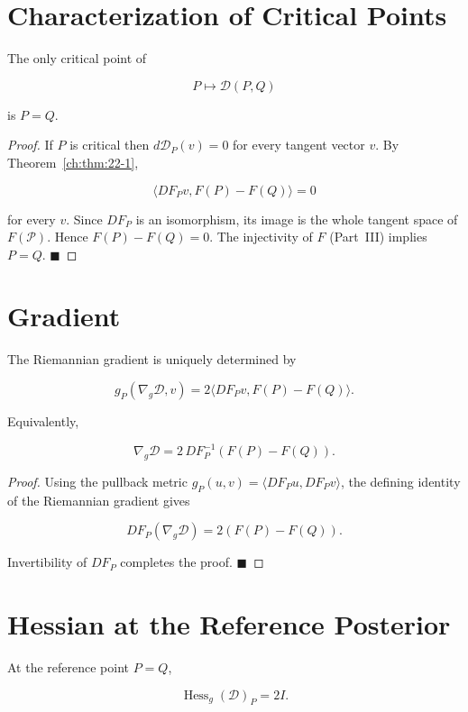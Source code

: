 \section{Characterization of Critical Points}

\begin{theorem}
\label{ch:thm:22-2}
The only critical point of

\[
P\mapsto\mathcal D(P,Q)
\]

is \(P=Q\).
\end{theorem}

\begin{proof}
If \(P\) is critical then \(d\mathcal D_P(v)=0\) for every tangent
vector \(v\). By Theorem~\ref{ch:thm:22-1},

\[
\langle DF_Pv,F(P)-F(Q)\rangle=0
\]

for every \(v\). Since \(DF_P\) is an isomorphism, its image is the
whole tangent space of \(F(\mathcal P)\). Hence \(F(P)-F(Q)=0\).
The injectivity of \(F\) (Part~III) implies \(P=Q\). $\blacksquare$
\end{proof}

\section{Gradient}

\begin{corollary}
\label{ch:cor:22-3}
The Riemannian gradient is uniquely determined by

\[
g_P(\nabla_g\mathcal D,v)=2\langle DF_Pv,F(P)-F(Q)\rangle.
\]

Equivalently,

\[
\nabla_g\mathcal D = 2\,DF_P^{-1}(F(P)-F(Q)).
\]
\end{corollary}

\begin{proof}
Using the pullback metric \(g_P(u,v)=\langle DF_Pu,DF_Pv\rangle\), the
defining identity of the Riemannian gradient gives

\[
DF_P(\nabla_g\mathcal D)=2(F(P)-F(Q)).
\]

Invertibility of \(DF_P\) completes the proof. $\blacksquare$
\end{proof}

\section{Hessian at the Reference Posterior}

\begin{theorem}
\label{ch:thm:22-4}
At the reference point \(P=Q\),

\[
\operatorname{Hess}_g(\mathcal D)_P = 2I.
\]
\end{theorem}

